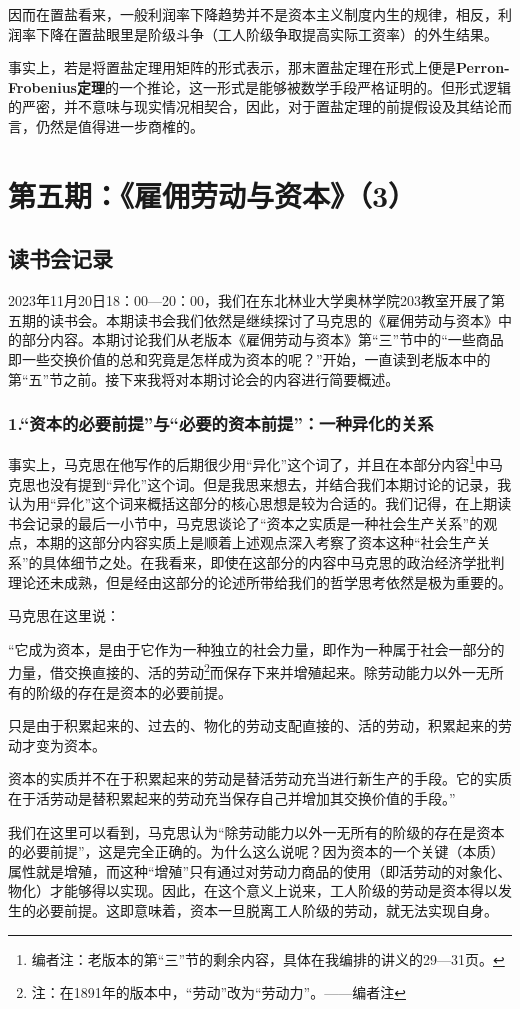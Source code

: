 \documentclass[a4paper,twoside,12pt,AutoFakeBold]{ctexart}
\begin{document}
因而在置盐看来，一般利润率下降趋势并不是资本主义制度内生的规律，相反，利润率下降在置盐眼里是阶级斗争（工人阶级争取提高实际工资率）的外生结果。

事实上，若是将置盐定理用矩阵的形式表示，那末置盐定理在形式上便是\textbf{Perron-Frobenius定理}的一个推论，这一形式是能够被数学手段严格证明的。但形式逻辑的严密，并不意味与现实情况相契合，因此，对于置盐定理的前提假设及其结论而言，仍然是值得进一步商榷的。
\newpage
\section{第五期：《雇佣劳动与资本》（3）}
\subsection{读书会记录}
2023年11月20日18：00—20：00，我们在东北林业大学奥林学院203教室开展了第五期的读书会。本期读书会我们依然是继续探讨了马克思的《雇佣劳动与资本》中的部分内容。本期讨论我们从老版本《雇佣劳动与资本》第“三”节中的“一些商品即一些交换价值的总和究竟是怎样成为资本的呢？”开始，一直读到老版本中的第“五”节之前。接下来我将对本期讨论会的内容进行简要概述。
\subsubsection{1.“资本的必要前提”与“必要的资本前提”：一种异化的关系}
事实上，马克思在他写作的后期很少用“异化”这个词了，并且在本部分内容\footnote{编者注：老版本的第“三”节的剩余内容，具体在我编排的讲义的29—31页。}中马克思也没有提到“异化”这个词。但是我思来想去，并结合我们本期讨论的记录，我认为用“异化”这个词来概括这部分的核心思想是较为合适的。我们记得，在上期读书会记录的最后一小节中，马克思谈论了“资本之实质是一种社会生产关系”的观点，本期的这部分内容实质上是顺着上述观点深入考察了资本这种“社会生产关系”的具体细节之处。在我看来，即使在这部分的内容中马克思的政治经济学批判理论还未成熟，但是经由这部分的论述所带给我们的哲学思考依然是极为重要的。

马克思在这里说：
\begin{adjustwidth}{2em}{2em}
    \qquad\fangsong
“它成为资本，是由于它作为一种独立的社会力量，即作为一种属于社会一部分的力量，借交换直接的、活的劳动\footnote{注：在1891年的版本中，“劳动”改为“劳动力”。——编者注}而保存下来并增殖起来。除劳动能力以外一无所有的阶级的存在是资本的必要前提。

只是由于积累起来的、过去的、物化的劳动支配直接的、活的劳动，积累起来的劳动才变为资本。

资本的实质并不在于积累起来的劳动是替活劳动充当进行新生产的手段。它的实质在于活劳动是替积累起来的劳动充当保存自己并增加其交换价值的手段。”
\end{adjustwidth}
我们在这里可以看到，马克思认为“除劳动能力以外一无所有的阶级的存在是资本的必要前提”，这是完全正确的。为什么这么说呢？因为资本的一个关键（本质）属性就是增殖，而这种“增殖”只有通过对劳动力商品的使用（即活劳动的对象化、物化）才能够得以实现。因此，在这个意义上说来，工人阶级的劳动是资本得以发生的必要前提。这即意味着，资本一旦脱离工人阶级的劳动，就无法实现自身。
\end{document}
